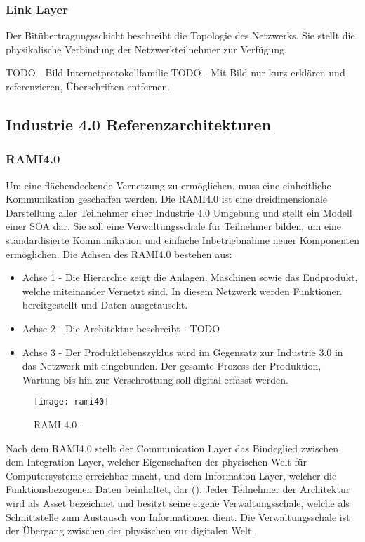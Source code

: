 \subsubsection{Link Layer}
Der Bitübertragungsschicht beschreibt die Topologie des Netzwerks. Sie stellt die physikalische Verbindung der Netzwerkteilnehmer zur Verfügung.

TODO - Bild Internetprotokollfamilie
TODO - Mit Bild nur kurz erklären und referenzieren, Überschriften entfernen.

\subsection{Industrie 4.0 Referenzarchitekturen}
\subsubsection{\ac{RAMI4.0}}
Um eine flächendeckende Vernetzung zu ermöglichen, muss eine einheitliche Kommunikation geschaffen werden. Die \ac{RAMI4.0} ist eine dreidimensionale Darstellung aller Teilnehmer einer Industrie 4.0 Umgebung und stellt ein Modell einer \ac{SOA} dar. Sie soll eine Verwaltungsschale für Teilnehmer bilden, um eine standardisierte Kommunikation und einfache Inbetriebnahme neuer Komponenten ermöglichen. \cite{rami2016} Die Achsen des \ac{RAMI4.0} bestehen aus:

\begin{itemize}
  \item Achse 1 - Die Hierarchie zeigt die Anlagen, Maschinen sowie das Endprodukt, welche miteinander Vernetzt sind. In diesem Netzwerk werden Funktionen bereitgestellt und Daten ausgetauscht.
  \item Achse 2 - Die Architektur beschreibt - TODO
  \item Achse 3 - Der Produktlebenszyklus wird im Gegensatz zur Industrie 3.0 in das Netzwerk mit eingebunden. Der gesamte Prozess der Produktion, Wartung bis hin zur Verschrottung soll digital erfasst werden.
\end{itemize}

\begin{figure}[h]
  \centering
  \texttt{[image: rami40]}
  \caption{RAMI 4.0 - \cite{rami2016}}
  \label{Kap2:RAMI 4.0}
\end{figure}

\clearpage

Nach dem \ac{RAMI4.0} stellt der Communication Layer das Bindeglied zwischen dem Integration Layer, welcher Eigenschaften der physischen Welt für Computersysteme erreichbar macht, und dem Information Layer, welcher die Funktionsbezogenen Daten beinhaltet, dar (\cite{BMWiNeCon2016}). Jeder Teilnehmer der Architektur wird als Asset bezeichnet und besitzt seine eigene Verwaltungsschale, welche als Schnittstelle zum Austausch von Informationen dient. Die Verwaltungsschale ist der Übergang zwischen der physischen zur digitalen Welt.

